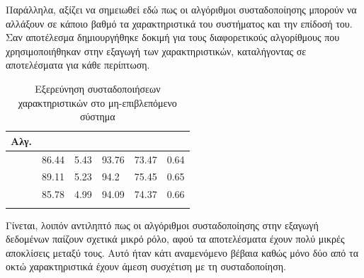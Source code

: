 Παράλληλα, αξίζει να σημειωθεί εδώ πως οι αλγόριθμοι συσταδοποίησης μπορούν να αλλάξουν σε κάποιο βαθμό τα χαρακτηριστικά του συστήματος και την επίδοσή του. Σαν αποτέλεσμα δημιουργήθηκε δοκιμή για τους διαφορετικούς αλγορίθμους που χρησιμοποιήθηκαν στην εξαγωγή των χαρακτηριστικών, καταλήγοντας σε αποτελέσματα για κάθε περίπτωση.
\begin{center}
\begin{longtabu} to 0.8\textwidth { | X[c] || X[c] | X[c] | X[c] | X[c] | X[c] |  }
 \hline
 Αλγ.&   &  &  &  & \\
\hline
  & 86.44	&	5.43 &	93.76 &	73.47 &	0.64\\
\hline
 & 89.11	&	5.23 &	94.2 &	75.45 &	0.65\\ 
 \hline
   & 85.78	&	4.99 &	94.09 &	74.37 &	0.66\\
\hline
\caption{Εξερεύνηση συσταδοποιήσεων χαρακτηριστικών στο μη-επιβλεπόμενο σύστημα}
\label{tab:testclusterunsup}
\end{longtabu}
\end{center}
Γίνεται, λοιπόν αντιληπτό πως οι αλγόριθμοι συσταδοποίησης στην εξαγωγή δεδομένων παίζουν σχετικά μικρό ρόλο, αφού τα αποτελέσματα έχουν πολύ μικρές αποκλίσεις μεταξύ τους. Αυτό ήταν κάτι αναμενόμενο βέβαια καθώς μόνο δύο από τα οκτώ χαρακτηριστικά έχουν άμεση συσχέτιση με τη συσταδοποίηση.\par
